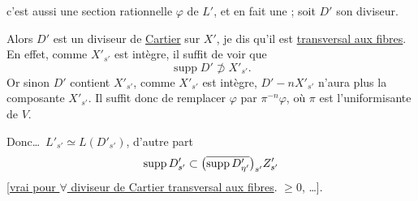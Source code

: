 c'est aussi une section rationnelle $\varphi$ de $L'$, et en fait une   ; soit $D'$ son diviseur.

Alors $D'$ est un diviseur de \uline{Cartier}  sur $X'$,  je dis qu'il est \uline{transversal aux fibres}.  En effet, comme $X'_{s'}$ est intègre, il suffit de voir que
\[
 \operatorname{supp}D'\not\supset X'_{s'}.
\]
Or sinon  $D'$ contient    $X'_{s'}$,  comme $X'_{s'}$ est intègre, $D'-nX'_{s'}$  n'aura plus la composante $X'_{s'}$. Il suffit donc de remplacer $\varphi$ par $\pi^{-n}\varphi$, où $\pi$ est l'uniformisante de $V$.


Donc\ldots\ $L'_{s'}\simeq L(D'_{s'})$, d'autre part
\[
 \operatorname{supp}D'_{s'}\subset\bigl(\overline{\operatorname{supp}D'_{\eta'}}\bigr)_{s'}Z'_{s'}
\]
[\uline{vrai pour $\forall$ diviseur de Cartier transversal aux fibres}.  $\geq0$, \ldots].
